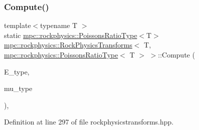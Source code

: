 \subsubsection{\texorpdfstring{Compute()}{Compute()}\hspace{0.1cm}{\footnotesize\ttfamily [4/6]}}
{\footnotesize\ttfamily template$<$typename T $>$ \\
static \mbox{\hyperlink{structmpc_1_1rockphysics_1_1_poissons_ratio_type}{mpc\+::rockphysics\+::\+Poissons\+Ratio\+Type}}$<$T$>$ \mbox{\hyperlink{structmpc_1_1rockphysics_1_1_rock_physics_transforms}{mpc\+::rockphysics\+::\+Rock\+Physics\+Transforms}}$<$ T, \mbox{\hyperlink{structmpc_1_1rockphysics_1_1_poissons_ratio_type}{mpc\+::rockphysics\+::\+Poissons\+Ratio\+Type}}$<$ T $>$ $>$\+::Compute (\begin{DoxyParamCaption}\item[{const \mbox{\hyperlink{structmpc_1_1rockphysics_1_1_youngs_modulus_type}{mpc\+::rockphysics\+::\+Youngs\+Modulus\+Type}}$<$ T $>$ \&}]{E\+\_\+type,  }\item[{const \mbox{\hyperlink{structmpc_1_1rockphysics_1_1_shear_modulus_type}{mpc\+::rockphysics\+::\+Shear\+Modulus\+Type}}$<$ T $>$ \&}]{mu\+\_\+type }\end{DoxyParamCaption})\hspace{0.3cm}{\ttfamily [inline]}, {\ttfamily [static]}}



Definition at line 297 of file rockphysicstransforms.\+hpp.

\mbox{\label{structmpc_1_1rockphysics_1_1_rock_physics_transforms_3_01_t_00_01mpc_1_1rockphysics_1_1_poissons_ratio_type_3_01_t_01_4_01_4_a374c2b89bf05cb9d9fd5833ca114b65a}} 

